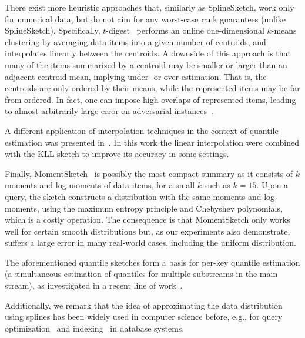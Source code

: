 \documentclass[acmsmall]{acmart}
\theoremstyle{remark}
\begin{document}
There exist more heuristic approaches that,
similarly as SplineSketch, work only for numerical data,
but do not aim for any worst-case rank guarantees (unlike SplineSketch).
Specifically, $t$-digest~\cite{dunning19-t-digest,dunning21} performs an online one-dimensional $k$-means clustering
by averaging data items into a given number of centroids, and interpolates linearly between the centroids.
A downside of this approach is that many of the items summarized by a centroid may be smaller or larger than an adjacent centroid mean, implying under- or over-estimation.
That is, the centroids are only ordered by their means,
while the represented items may be far from ordered.
In fact, one can impose high overlaps of represented items, leading to almost arbitrarily large error on adversarial instances~\cite{CormodeMRV21}.

A different application of interpolation techniques in the context of quantile estimation was presented in~\cite{SchieferCINSW23-KLLinterpolation}.
In this work the linear interpolation were combined with the KLL sketch to improve its accuracy in some settings.

Finally, MomentSketch~\cite{GanDTSB18,MitchellFH21} is possibly the most compact summary as it consists of $k$ moments and log-moments of data items,
for a small $k$ such as $k=15$. 
Upon a query, the sketch constructs a distribution with the same moments and log-moments, using the maximum entropy principle
and Chebyshev polynomials, which is a costly operation.
The consequence is that MomentSketch only works well for certain smooth distributions but, as our experiments also demonstrate,
suffers a large error in many real-world cases,
including the uniform distribution.


The aforementioned quantile sketches form a basis for per-key quantile estimation (a simultaneous estimation of quantiles for multiple substreams in the main stream), as investigated in a recent line of work~\cite{dong.etal:2024:2024ieee40thint.conf.dataeng.icdea,guo.etal:2023:proc.29thacmsigkddconf.knowl.discov.datamin.,he.etal:2023:2023ieee39thint.conf.dataeng.icdea, shahout.etal:2023:proc.acmmanag.data}.

	Additionally, we remark that the idea of approximating the data distribution using splines has been widely used in computer science before, e.g., for query optimization~\cite{neumann.michel:2008:shar.datainf.knowl.} and indexing~\cite{kipf.etal:2020:} in database systems.
\end{document}

